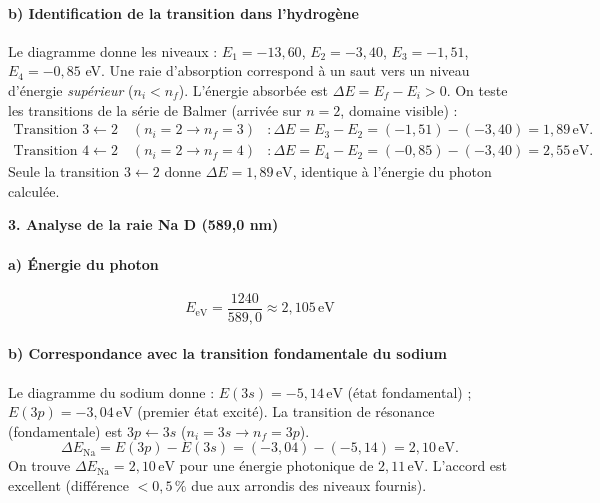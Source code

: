 \documentclass[11pt]{article}
\begin{document}
\begin{exoresolu}
\paragraph{b) Identification de la transition dans l'hydrogène}
Le diagramme donne les niveaux : $E_1=-13{,}60$, $E_2=-3{,}40$, $E_3=-1{,}51$, $E_4=-0{,}85$ eV.
Une raie d'absorption correspond à un saut vers un niveau d'énergie \emph{supérieur} ($n_i < n_f$). L'énergie absorbée est $\Delta E = E_f - E_i > 0$.
On teste les transitions de la série de Balmer (arrivée sur $n=2$, domaine visible) :
\begin{align*}
\text{Transition } 3 \leftarrow 2 \quad (n_i=2 \to n_f=3) &: \Delta E = E_3 - E_2 = (-1{,}51) - (-3{,}40) = 1{,}89\,\text{eV}. \\
\text{Transition } 4 \leftarrow 2 \quad (n_i=2 \to n_f=4) &: \Delta E = E_4 - E_2 = (-0{,}85) - (-3{,}40) = 2{,}55\,\text{eV}.
\end{align*}
Seule la transition $3 \leftarrow 2$ donne $\Delta E = 1{,}89\,\text{eV}$, identique à l'énergie du photon calculée.

\medskip
\noindent\textbf{3. Analyse de la raie Na D (589,0 nm)}
\medskip
\paragraph{a) Énergie du photon}
\[
E_{\text{eV}} = \frac{1240}{589{,}0} \approx 2{,}105\,\text{eV}
\]

\paragraph{b) Correspondance avec la transition fondamentale du sodium}
Le diagramme du sodium donne : $E(3s) = -5{,}14\,\text{eV}$ (état fondamental) ; $E(3p) = -3{,}04\,\text{eV}$ (premier état excité).
La transition de résonance (fondamentale) est $3p \leftarrow 3s$ ($n_i=3s \to n_f=3p$).
\[
\Delta E_{\text{Na}} = E(3p) - E(3s) = (-3{,}04) - (-5{,}14) = 2{,}10\,\text{eV}.
\]
On trouve $\Delta E_{\text{Na}} = 2{,}10\,\text{eV}$ pour une énergie photonique de $2{,}11\,\text{eV}$. L'accord est excellent (différence $< 0{,}5\,\%$ due aux arrondis des niveaux fournis).


\end{exoresolu}
\end{document}
